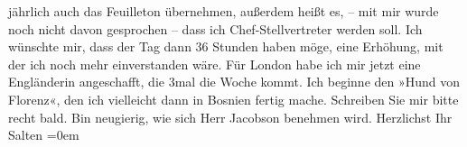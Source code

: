 \begin{ledgroupsized}[t]{13cm}
               jährlich auch das Feuilleton übernehmen, außerdem heißt es, – mit mir wurde noch
               nicht davon gesprochen – dass ich Chef-Stellvertreter werden soll. Ich wünschte mir,
               dass der Tag dann 36 Stunden haben möge, eine Erhöhung, mit der ich noch mehr
               einverstanden wäre. Für London habe ich mir jetzt
               eine Engländerin
               angeschafft, die 3mal die Woche kommt. Ich beginne den »Hund {\pb}von
                  Florenz«, den ich vielleicht dann in Bosnien fertig mache. \pend
           \pstart
           Schreiben Sie mir bitte recht bald. Bin neugierig, wie sich Herr Jacobson benehmen wird. \pend
           \pstart
           Herzlichst Ihr {\\[\baselineskip]}\spacefill\mbox{Salten}\pend
           \leftskip=0em{}
         
         \endnumbering{}\end{ledgroupsized}\begin{anhang}\end{anhang}\newcommand{\dateiname}{L03339}\newcommand{\titel}{Felix Salten an Arthur Schnitzler, 3. 3. 1903}\newcommand{\editorInnen}{Martin Anton Müller und Laura Untner}
      